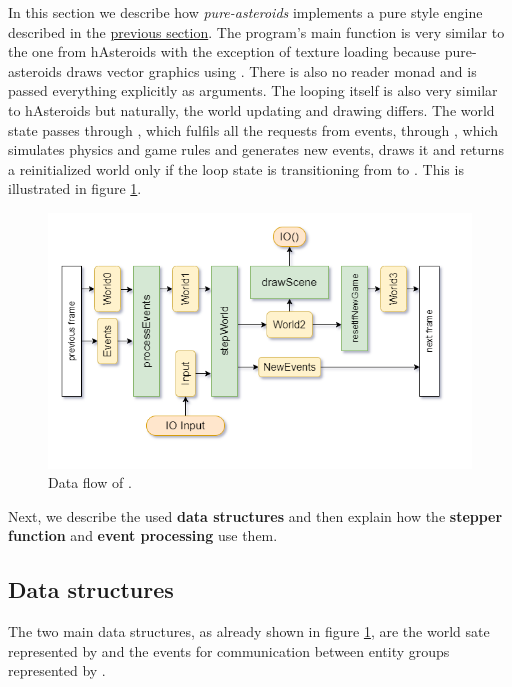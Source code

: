 \documentclass[
  digital, %
  color,   %
  table,   %
  oneside, %
  lof,     %
  lot,     %
]{fithesis3}
\begin{document}
In this section we describe how \emph{pure-asteroids} implements a pure style engine described
in the \hyperref[sect:pureengines]{previous section}.
The program's main function is very similar to the one from
hAsteroids with the exception of texture loading because pure-asteroids
draws vector graphics using . There is also no reader monad
and  is passed everything explicitly as arguments.
The looping itself is also very similar to hAsteroids but naturally,
the world updating and drawing differs. The world state passes through
, which fulfils all the requests from events,
through , which simulates physics and game rules and generates new events,
 draws it and  returns a reinitialized
world only if the loop state is transitioning from  to .
This is illustrated in figure \ref{fig:worldeventsflow}.
\begin{figure}
    \centering
    \includegraphics[width=\textwidth]{images/world-flow-detailed.png}
    \caption{Data flow of .}
    \label{fig:worldeventsflow}
\end{figure}
Next, we describe the used \textbf{data structures} and then explain
how the \textbf{stepper function} and \textbf{event processing} use them.


\subsection{Data structures}
The two main data structures, as already shown in figure \ref{fig:worldeventsflow},
are the world sate represented by  and the events for communication
between entity groups represented by .
\end{document}
